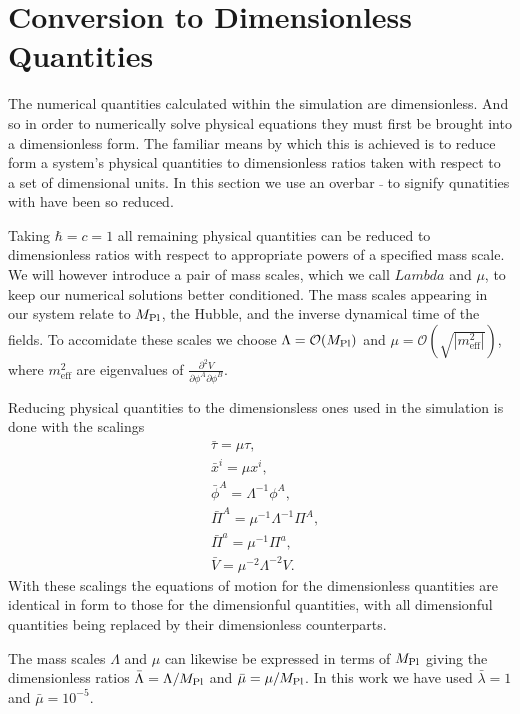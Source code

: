

\section{Conversion to Dimensionless Quantities}
The numerical quantities calculated within the simulation are dimensionless. And so in order to numerically solve physical equations they must first be brought into a dimensionless form. The familiar means by which this is achieved is to reduce form a system's physical quantities to dimensionless ratios taken with respect to a set of dimensional units. In this section we use an overbar $\bar{}$ to signify qunatities with have been so reduced.

Taking $\hbar=c=1$ all remaining physical quantities can be reduced to dimensionless ratios with respect to appropriate powers of a specified mass scale. We will however introduce a pair of mass scales, which we call $Lambda$ and $\mu$, to keep our numerical solutions better conditioned. The mass scales appearing in our system relate to $M_{\mathrm{Pl}}$, the Hubble, and the inverse dynamical time of the fields. To accomidate these scales we choose $\Lambda = \mathcal{O}(M_{\mathrm{Pl}})$ and $\mu = \mathcal{O}(\sqrt{|m^2_\mathrm{eff}|})$, where $m^2_\mathrm{eff}$ are eigenvalues of $\frac{\partial^2 V}{\partial\phi^A\partial\phi^B}$.

Reducing physical quantities to the dimensionsless ones used in the simulation is done with the scalings
\begin{align}
  & \bar{\tau} = \mu\tau, \\
  & \bar{x}^i = \mu x^i, \\ 
  & \bar{\phi}^A = \Lambda^{-1}\phi^A, \\
  & \bar{\Pi}^A = \mu^{-1}\Lambda^{-1}\Pi^A, \\
  & \bar{\Pi}^a = \mu^{-1}\Pi^a, \\
  & \bar{V} = \mu^{-2}\Lambda^{-2}V.
\end{align}
With these scalings the equations of motion for the dimensionless quantities are identical in form to those for the dimensionful quantities, with all dimensionful quantities being replaced by their dimensionless counterparts.

The mass scales $\Lambda$ and $\mu$ can likewise be expressed in terms of $M_{\mathrm{Pl}}$ giving the dimensionless ratios $\bar{\Lambda} = \Lambda/M_{\mathrm{Pl}}$ and $\bar{\mu} = \mu/M_{\mathrm{Pl}}$. In this work we have used $\bar{\lambda} = 1$ and $\bar{\mu} = 10^{-5}$.
